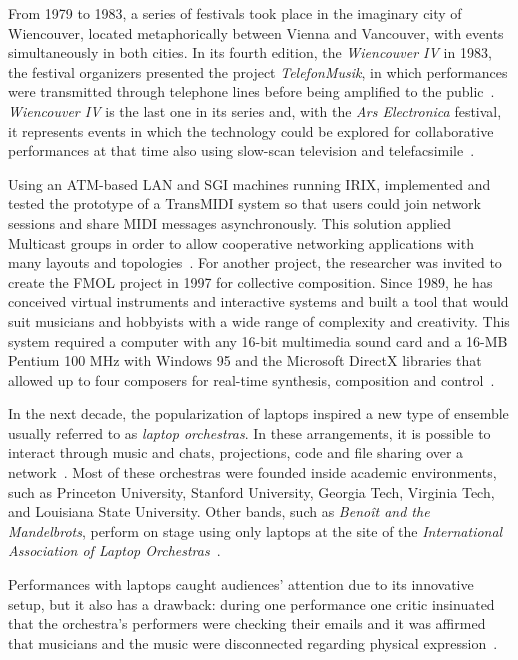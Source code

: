 From 1979 to 1983, a series of festivals took place in the imaginary city of Wiencouver, located metaphorically between Vienna and Vancouver, with events simultaneously in both cities.
In its fourth edition, the \textit{Wiencouver IV} in 1983, the festival organizers presented the project \textit{TelefonMusik}, in which performances were transmitted through telephone lines before being amplified to the public~\citep[p.~19-20]{Corby2013}.
\textit{Wiencouver IV} is the last one in its series and, with the \textit{Ars Electronica} festival, it represents events in which the technology could be explored for collaborative performances at that time also using slow-scan television and telefacsimile~\citep[p.~146-147]{Gere2006art}. 

Using an ATM-based LAN and SGI machines running IRIX, \cite{Gang1997transmidi} implemented and tested the prototype of a TransMIDI system so that users could join network sessions and share MIDI messages asynchronously.
This solution applied Multicast groups in order to allow cooperative networking applications with many layouts and topologies~\citep{Gang1997transmidi}.
For another project, the researcher  was invited to create the FMOL project in 1997 for collective composition.
Since 1989, he has conceived virtual instruments and interactive systems and built a tool that would suit musicians and hobbyists with a wide range of complexity and creativity.
This system required a computer with any 16-bit multimedia sound card and a 16-MB Pentium 100 MHz with Windows 95 and the Microsoft DirectX libraries that allowed up to four composers for real-time synthesis, composition and control~\citep{Jorda1999fmol}.

In the next decade, the popularization of laptops inspired a new type of ensemble usually referred to as \textit{laptop orchestras}.
In these arrangements, it is possible to interact through music and chats, projections, code and file sharing over a network~\citep{Gasperini2011laptop}.
Most of these orchestras were founded inside academic environments, such as Princeton University, Stanford University, Georgia Tech, Virginia Tech, and Louisiana State University.
Other bands, such as \textit{Benoît and the Mandelbrots}, perform on stage using only laptops at the site of the \textit{International Association of Laptop Orchestras}~\citep{IALO2016laptop}.

Performances with laptops caught audiences' attention due to its innovative setup, but it also has a drawback: during one performance one critic insinuated that the orchestra's performers were checking their emails and it was affirmed that musicians and the music were disconnected regarding physical expression~\citep{Trueman2007}.

